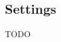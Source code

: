\documentclass[FIPLY_base.tex]{subfiles}
\begin{document}
\subsection{Settings}
TODO
\end{document}
